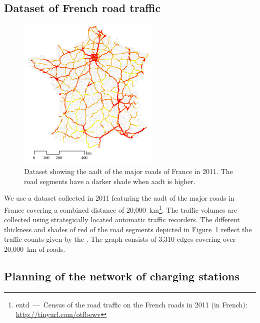 \subsection{Dataset of French road traffic}

\begin{figure}
    \vspace{-20pt}
    \centering
    \includegraphics[width=6.8cm]{figures/france-dataset.pdf}
    \caption{Dataset showing the \acrfull{aadt} of the major roads of France in 2011. The road segments have a darker shade when \acrshort{aadt} is higher.}
    \label{fig:france-dataset}
\end{figure}
We use a dataset collected in 2011 featuring the \acrfull{aadt} of the major roads in France covering a combined distance of 20,000~km\footnote{\acrshort{entd}~---~Census of the road traffic on the French roads in 2011 (in French): \url{http://tinyurl.com/otfbewv}}.  The traffic volumes are collected using strategically located automatic traffic recorders. The different thickness and shades of red of the road segments depicted in Figure~\ref{fig:france-dataset} reflect the traffic counts given by the . The graph consists of 3,310 edges covering over 20,000~km of roads. 

\subsection{Planning of the network of charging stations}
\label{sec:charging-station-network}

